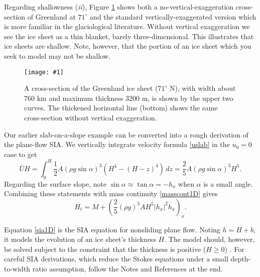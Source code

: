 \documentclass[letterpaper,final,12pt,reqno]{amsart}
\newcommand{\onefigsize}[3]{
\begin{figure}[ht]
\centering
\texttt{[image: \#1]}
\caption{#2}
\label{fig:#1}
\end{figure}}
\begin{document}
Regarding shallowness (\emph{ii}), Figure \ref{fig:green-transect} shows both a no-vertical-exaggeration cross-section of Greenland at $71^\circ$ and the standard vertically-exaggerated version which is more familiar in the glaciological literature.  Without vertical exaggeration we see the ice sheet as a thin blanket, barely three-dimensional.  This illustrates that ice sheets are shallow.  Note, however, that the portion of an ice sheet which you seek to model may not be shallow.

\medskip

\onefigsize{green-transect}{A cross-section of the Greenland ice sheet ($71^\circ$ N), with width about 760 km and maximum thickness 3200 m, is shown by the upper two curves.  The thickened horizontal line (bottom) shows the same cross-section without vertical exaggeration.}{4.0in}

Our earlier slab-on-a-slope example can be converted into a rough derivation of the plane-flow SIA.  We vertically integrate velocity formula \eqref{uslab} in the $u_0=0$ case to get
\begin{equation}
\bar U H = \int_0^H \frac{1}{2} A (\rho g \sin\alpha)^3  \left(H^4 - (H-z)^4\right)\,dz = \frac{2}{5} A (\rho g \sin\alpha)^3 H^5. \label{siaubar}
\end{equation}
Regarding the surface slope, note $\sin \alpha \approx \tan\alpha = - h_x$ when $\alpha$ is a small angle.  Combining these statements with mass continuity \eqref{masscont1D} gives
\begin{equation}
  H_t = M + \left(\frac{2}{5} (\rho g)^3 A H^5 |h_x|^2 h_x\right)_x. \label{sia1D}
\end{equation}

Equation \eqref{sia1D} is the SIA equation for nonsliding plane flow.  Noting $h=H+b$, it models the evolution of an ice sheet's thickness $H$.  The model should, however, be solved subject to the constraint that the thickness is positive ($H\ge 0$) \cite{Bueler2016,JouvetBueler2012}.  For careful SIA derivations, which reduce the Stokes equations under a small depth-to-width ratio assumption, follow the Notes and References at the end.
\end{document}
